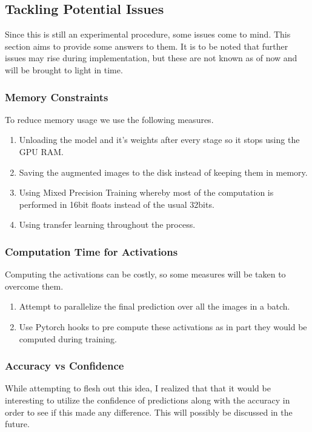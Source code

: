 \subsection{Tackling Potential Issues}
Since this is still an experimental procedure, some issues come to mind. This section aims to provide some answers to them. It is to be noted that further issues may rise during implementation, but these are not known as of now and will be brought to light in time.
\subsubsection*{Memory Constraints}
To reduce memory usage we use the following measures.
\begin{enumerate}
    \item Unloading the model and it's weights after every stage so it stops using the GPU RAM.
    \item Saving the augmented images to the disk instead of keeping them in memory.
    \item Using Mixed Precision Training whereby most of the computation is performed in 16bit floats instead of the usual 32bits.
    \item Using transfer learning throughout the process.
\end{enumerate}
\subsubsection*{Computation Time for Activations}
Computing the activations can be costly, so some measures will be taken to overcome them.
\begin{enumerate}
    \item Attempt to parallelize the final prediction over all the images in a batch.
    \item Use Pytorch hooks to pre compute these activations as in part they would be computed during training.
\end{enumerate}
\subsubsection*{Accuracy vs Confidence}
While attempting to flesh out this idea, I realized that that it would be interesting to utilize the confidence of predictions along with the accuracy in order to see if this made any difference. This will possibly be discussed in the future.
